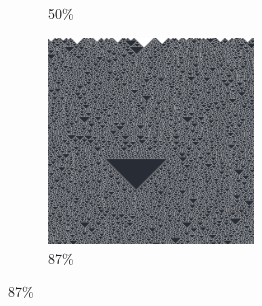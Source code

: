 \documentclass[12pt, fleqn]{report}                             %
\theoremstyle{break}                                            %
\begin{document}
\begin{figure}[ht!]
\begin{subfigure}[b]{0.4\linewidth}
          \caption{50\%}
        \end{subfigure}
        \begin{subfigure}[b]{0.4\linewidth}
          \includegraphics[width=0.6\textwidth]{Images/146/d.png}
          \caption{87\%}
        \end{subfigure}
      \end{figure}
\end{document}
